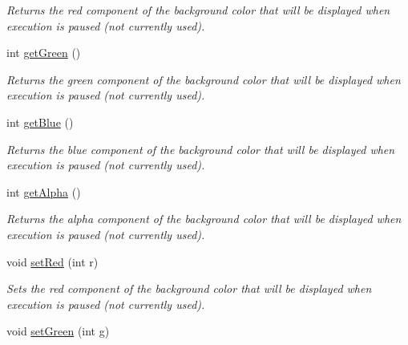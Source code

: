 \begin{DoxyCompactItemize}
\begin{DoxyCompactList}\small\item\em Returns the red component of the background color that will be displayed when execution is paused (not currently used). \end{DoxyCompactList}\item 
\hypertarget{class_picto_1_1_pause_point_ac162a7fd4785aef498ba4f769ffe9387}{int \hyperlink{class_picto_1_1_pause_point_ac162a7fd4785aef498ba4f769ffe9387}{get\-Green} ()}\label{class_picto_1_1_pause_point_ac162a7fd4785aef498ba4f769ffe9387}

\begin{DoxyCompactList}\small\item\em Returns the green component of the background color that will be displayed when execution is paused (not currently used). \end{DoxyCompactList}\item 
\hypertarget{class_picto_1_1_pause_point_a704c9f28252bc3e58880b9e0bf74ffb8}{int \hyperlink{class_picto_1_1_pause_point_a704c9f28252bc3e58880b9e0bf74ffb8}{get\-Blue} ()}\label{class_picto_1_1_pause_point_a704c9f28252bc3e58880b9e0bf74ffb8}

\begin{DoxyCompactList}\small\item\em Returns the blue component of the background color that will be displayed when execution is paused (not currently used). \end{DoxyCompactList}\item 
\hypertarget{class_picto_1_1_pause_point_ad4859742bbd420cb833ffcd8b078112c}{int \hyperlink{class_picto_1_1_pause_point_ad4859742bbd420cb833ffcd8b078112c}{get\-Alpha} ()}\label{class_picto_1_1_pause_point_ad4859742bbd420cb833ffcd8b078112c}

\begin{DoxyCompactList}\small\item\em Returns the alpha component of the background color that will be displayed when execution is paused (not currently used). \end{DoxyCompactList}\item 
\hypertarget{class_picto_1_1_pause_point_aed278beca9c311934a6945945ffafb9e}{void \hyperlink{class_picto_1_1_pause_point_aed278beca9c311934a6945945ffafb9e}{set\-Red} (int r)}\label{class_picto_1_1_pause_point_aed278beca9c311934a6945945ffafb9e}

\begin{DoxyCompactList}\small\item\em Sets the red component of the background color that will be displayed when execution is paused (not currently used). \end{DoxyCompactList}\item 
\hypertarget{class_picto_1_1_pause_point_a1d82dbc1fe2e59f2967cde6c45fabcfd}{void \hyperlink{class_picto_1_1_pause_point_a1d82dbc1fe2e59f2967cde6c45fabcfd}{set\-Green} (int g)}\label{class_picto_1_1_pause_point_a1d82dbc1fe2e59f2967cde6c45fabcfd}


\end{DoxyCompactItemize}
